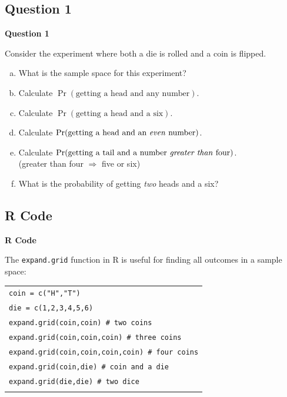 \documentclass[compress]{beamer}        %
\makeatletter
\newcommand{\tcb}{\textcolor{beamer@blendedblue}}
\makeatother
\begin{document}
\subsection{Question 1}
\begin{frame}{\bf \tcb{Question 1}}

Consider the experiment where both a die is rolled and a coin is flipped.\\[0.2cm]
\begin{enumerate}[a)]\itemsep0.2cm
\item What is the sample space for this experiment?
\item Calculate $\Pr(\text{getting a head and any number})$.
\item Calculate $\Pr(\text{getting a head and a six})$.
\item Calculate $\Pr(\text{getting a head and an \emph{even} number})$.
\item Calculate $\Pr(\text{getting a tail and a number \emph{greater than} four})$.\\{\footnotesize(greater than four $\Rightarrow$ five or six)}
\item What is the probability of getting \emph{two} heads and a six?
\end{enumerate}

\end{frame}

\subsection{R Code}
\begin{frame}{\bf \tcb{R Code}}

The \texttt{expand.grid} function in R is useful for finding all outcomes in a sample space:\\[0.2cm]
\begin{tabular}{|l|}
\hline
\texttt{coin = c("H","T")}\\
\texttt{die = c(1,2,3,4,5,6)}\\[0.4cm]
\texttt{expand.grid(coin,coin) \# two coins}\\
\texttt{expand.grid(coin,coin,coin) \# three coins}\\
\texttt{expand.grid(coin,coin,coin,coin) \# four coins}\\
\texttt{expand.grid(coin,die) \# coin and a die}\\
\texttt{expand.grid(die,die) \# two dice}\\
\hline
\multicolumn{1}{c}{}\\[-0.1cm]
\end{tabular}

\end{frame}
\end{document}
